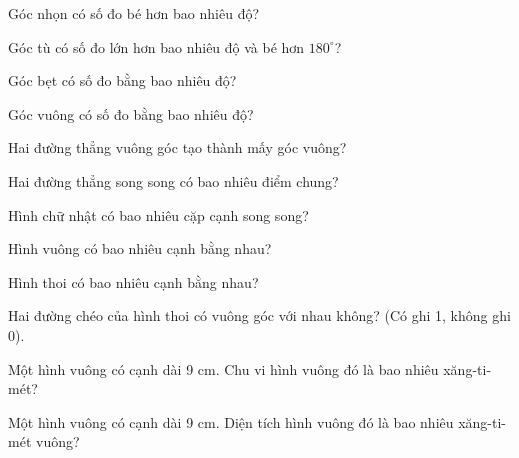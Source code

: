 \begin{ex}
Góc nhọn có số đo bé hơn bao nhiêu độ?
\end{ex}

\begin{ex}
Góc tù có số đo lớn hơn bao nhiêu độ và bé hơn $180^\circ$?
\end{ex}

\begin{ex}
Góc bẹt có số đo bằng bao nhiêu độ?
\end{ex}

\begin{ex}
Góc vuông có số đo bằng bao nhiêu độ?
\end{ex}

\begin{ex}
Hai đường thẳng vuông góc tạo thành mấy góc vuông?
\end{ex}

\begin{ex}
Hai đường thẳng song song có bao nhiêu điểm chung?
\end{ex}

\begin{ex}
Hình chữ nhật có bao nhiêu cặp cạnh song song?
\end{ex}

\begin{ex}
Hình vuông có bao nhiêu cạnh bằng nhau?
\end{ex}

\begin{ex}
Hình thoi có bao nhiêu cạnh bằng nhau?
\end{ex}

\begin{ex}
Hai đường chéo của hình thoi có vuông góc với nhau không? (Có ghi 1, không ghi 0).
\end{ex}

\begin{ex}
Một hình vuông có cạnh dài 9 cm. Chu vi hình vuông đó là bao nhiêu xăng-ti-mét?
\end{ex}

\begin{ex}
Một hình vuông có cạnh dài 9 cm. Diện tích hình vuông đó là bao nhiêu xăng-ti-mét vuông?
\end{ex}

